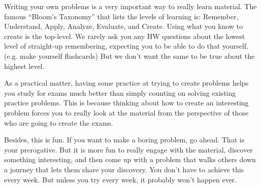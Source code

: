 Writing your own problems is a very important way to really learn
material. The famous ``Bloom's Taxonomy'' that lists the levels of
learning is: Remember, Understand, Apply, Analyze, Evaluate, and
Create. Using what you know to create is the top-level. We rarely ask
you any HW questions about the lowest level of straight-up
remembering, expecting you to be able to do that yourself. (e.g. make
yourself flashcards) But we don't want the same to be true about the
highest level.

As a practical matter, having some practice at trying to create
problems helps you study for exams much better than simply counting on
solving existing practice problems. This is because thinking about how
to create an interesting problem forces you to really look at the
material from the perspective of those who are going to create the
exams. 

Besides, this is fun. If you want to make a boring problem, go
ahead. That is your prerogative. But it is more fun to really engage
with the material, discover something interesting, and then come up
with a problem that walks others down a journey that lets them share
your discovery. You don't have to achieve this every week. But unless
you try every week, it probably won't happen ever. 